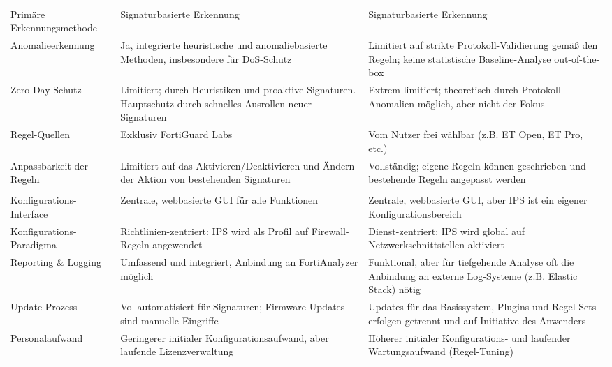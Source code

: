 \begin{longtable}{>{\RaggedRight}p{} >{\RaggedRight}p{} >{\RaggedRight}p{}}
	\multicolumn{3}{l}{\textbf{III. Erkennungsmethoden \& Intelligenz}} \\
	\midrule
	Primäre Erkennungsmethode & Signaturbasierte Erkennung & Signaturbasierte Erkennung \\
	\addlinespace
	Anomalieerkennung & Ja, integrierte heuristische und anomaliebasierte Methoden, insbesondere für DoS-Schutz & Limitiert auf strikte Protokoll-Validierung gemäß den Regeln; keine statistische Baseline-Analyse out-of-the-box \\
	\addlinespace
	Zero-Day-Schutz & Limitiert; durch Heuristiken und proaktive Signaturen. Hauptschutz durch schnelles Ausrollen neuer Signaturen & Extrem limitiert; theoretisch durch Protokoll-Anomalien möglich, aber nicht der Fokus \\
	\addlinespace
	Regel-Quellen & Exklusiv FortiGuard Labs & Vom Nutzer frei wählbar (z.B. ET Open, ET Pro, etc.) \\
	\addlinespace
	Anpassbarkeit der Regeln & Limitiert auf das Aktivieren/Deaktivieren und Ändern der Aktion von bestehenden Signaturen & Vollständig; eigene Regeln können geschrieben und bestehende Regeln angepasst werden \\
	\midrule
	
	\multicolumn{3}{l}{\textbf{IV. Verwaltung \& Betrieb}} \\
	\midrule
	Konfigurations-Interface & Zentrale, webbasierte GUI für alle Funktionen & Zentrale, webbasierte GUI, aber IPS ist ein eigener Konfigurationsbereich \\
	\addlinespace
	Konfigurations-Paradigma & Richtlinien-zentriert: IPS wird als Profil auf Firewall-Regeln angewendet & Dienst-zentriert: IPS wird global auf Netzwerkschnittstellen aktiviert \\
	\addlinespace
	Reporting \& Logging & Umfassend und integriert, Anbindung an FortiAnalyzer möglich & Funktional, aber für tiefgehende Analyse oft die Anbindung an externe Log-Systeme (z.B. Elastic Stack) nötig \\
	\addlinespace
	Update-Prozess & Vollautomatisiert für Signaturen; Firmware-Updates sind manuelle Eingriffe & Updates für das Basissystem, Plugins und Regel-Sets erfolgen getrennt und auf Initiative des Anwenders \\
	\addlinespace
	Personalaufwand & Geringerer initialer Konfigurationsaufwand, aber laufende Lizenzverwaltung & Höherer initialer Konfigurations- und laufender Wartungsaufwand (Regel-Tuning) \\
	\midrule
	

\end{longtable}

